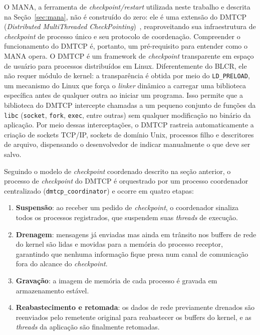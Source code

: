 O MANA, a ferramenta de \textit{checkpoint/restart} utilizada neste trabalho e descrita na
Seção~\ref{sec:mana}, não é construído do zero: ele é uma extensão do
DMTCP (\textit{Distributed MultiThreaded CheckPointing})~\cite{ansel2009dmtcp},
reaproveitando sua infraestrutura de \textit{checkpoint} de processo único e seu protocolo de
coordenação. Compreender o funcionamento do DMTCP é, portanto, um pré-requisito para
entender como o MANA opera. O DMTCP é um framework de \textit{checkpoint} transparente em
espaço de usuário para processos distribuídos em Linux. Diferentemente do BLCR, ele não
requer módulo de kernel: a transparência é obtida por meio do \texttt{LD\_PRELOAD}, um
mecanismo do Linux que força o \textit{linker} dinâmico a carregar uma biblioteca
específica antes de qualquer outra ao iniciar um programa. Isso permite que a
biblioteca do DMTCP intercepte chamadas a um pequeno conjunto de funções da
\texttt{libc} (\texttt{socket}, \texttt{fork}, \texttt{exec}, entre outras) sem
qualquer modificação no binário da aplicação. Por meio dessas interceptações, o DMTCP
rastreia automaticamente a criação de sockets TCP/IP, sockets de domínio Unix,
processos filho e descritores de arquivo, dispensando o desenvolvedor de indicar
manualmente o que deve ser salvo.

Seguindo o modelo de \textit{checkpoint} coordenado descrito na seção anterior, o
processo de \textit{checkpoint} do DMTCP é orquestrado por um processo coordenador
centralizado (\texttt{dmtcp\_\allowbreak coordinator}) e ocorre em quatro etapas:

\begin{enumerate}
  \item \textbf{Suspensão}: ao receber um pedido de \textit{checkpoint}, o coordenador sinaliza
    todos os processos registrados, que suspendem suas \textit{threads} de execução.
  \item \textbf{Drenagem}: mensagens já enviadas mas ainda em trânsito nos buffers de
    rede do kernel são lidas e movidas para a memória do processo receptor, garantindo
    que nenhuma informação fique presa num canal de comunicação fora do alcance do
    \textit{checkpoint}.
  \item \textbf{Gravação}: a imagem de memória de cada processo é gravada em
    armazenamento estável.
  \item \textbf{Reabastecimento e retomada}: os dados de rede previamente drenados são
    reenviados pelo remetente original para reabastecer os buffers do kernel, e as
    \textit{threads} da aplicação são finalmente retomadas.
\end{enumerate}

